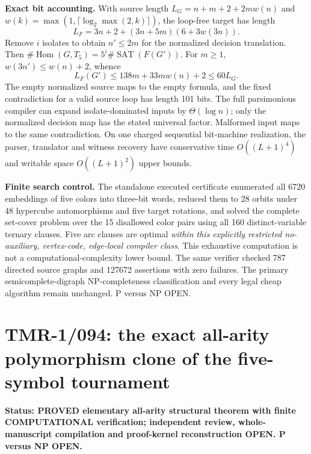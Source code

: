 \documentclass[11pt]{article}
\begin{document}
\noindent\textbf{Exact bit accounting.} With source length
$L_G=n+m+2+2mw(n)$ and $w(k)=\max(1,\lceil\log_2\max(2,k)\rceil)$,
the loop-free target has length
\[
 L_F=3n+2+(3n+5m)(6+3w(3n)).
\]
Remove $i$ isolates to obtain $n'\leq2m$ for the normalized decision
translation. Then $\#\operatorname{Hom}(G,T_5)=5^i\#\operatorname{SAT}(F(G'))$.
For $m\ge1$, $w(3n')\le w(n)+2$, whence
\[
 L_F(G')\le138m+33mw(n)+2\le 60L_G.
\]
The empty normalized source maps to the empty formula, and the
fixed contradiction for a valid source loop has length 101 bits.
The full parsimonious compiler can expand isolate-dominated inputs
by $\Theta(\log n)$; only the normalized decision map has the
stated universal factor. Malformed input maps to the same contradiction.
On one charged sequential bit-machine realization, the parser,
translator and witness recovery have conservative time
$O((L+1)^4)$ and writable space $O((L+1)^2)$ upper bounds.

\noindent\textbf{Finite search control.} The standalone executed certificate
enumerated all 6720 embeddings of five colors into three-bit words,
reduced them to 28 orbits under 48 hypercube automorphisms and five
target rotations, and solved the complete set-cover problem over
the 15 disallowed color pairs using all 160 distinct-variable ternary
clauses. Five arc clauses are optimal \emph{within this explicitly
restricted no-auxiliary, vertex-code, edge-local compiler class}.
This exhaustive computation is not a computational-complexity lower
bound. The same verifier checked 787 directed source graphs and
127672 assertions with zero failures. The primary semicomplete-digraph
NP-completeness classification and every legal cheap algorithm remain
unchanged. P versus NP OPEN.



\section{TMR-1/094: the exact all-arity polymorphism clone of the five-symbol tournament}
\noindent\textbf{Status: PROVED elementary all-arity structural theorem with
finite COMPUTATIONAL verification; independent review, whole-manuscript
compilation and proof-kernel reconstruction OPEN. P versus NP OPEN.}
\end{document}
